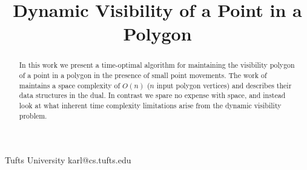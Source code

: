 \documentclass[10pt,preprint]{sigplanconf}
\begin{document}
\setlength{\pdfpageheight}{\paperheight}
\setlength{\pdfpagewidth}{\paperwidth}






\title{Dynamic Visibility of a Point in a Polygon}


           {Tufts University}
           {karl@cs.tufts.edu}


\maketitle

\begin{abstract}
In this work we present a time-optimal algorithm for maintaining
the visibility polygon of a point in a polygon in the presence of
small point movements.
The work of \cite{dynamic-visibility} maintains a space complexity
of $O(n)$ ($n$ input polygon vertices) and describes their data
structures in the dual. In contrast we spare no expense with space,
and instead look at what inherent time complexity limitations arise
from the dynamic visibility problem.
\end{abstract}
\end{document}
